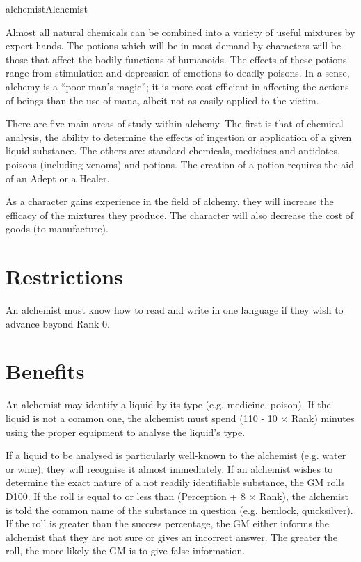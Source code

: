 \begin{Skill}[1.1]{alchemist}{Alchemist}

Almost all natural chemicals can be combined into a variety of useful
mixtures by expert hands.  The potions which will be in most demand by
characters will be those that affect the bodily functions of
humanoids. The effects of these potions range from stimulation and
depression of emotions to deadly poisons.  In a sense, alchemy is a
“poor man’s magic”; it is more cost-efficient in affecting the actions
of beings than the use of mana, albeit not as easily applied to the
victim.

There are five main areas of study within alchemy.  The first is that
of chemical analysis, the ability to determine the effects of
ingestion or application of a given liquid substance.  The others are:
standard chemicals, medicines and antidotes, poisons (including
venoms) and potions.  The creation of a potion requires the aid of an
Adept or a Healer.

As a character gains experience in the field of alchemy, they will
increase the efficacy of the mixtures they produce.  The character
will also decrease the cost of goods (to manufacture).

\section{Restrictions}

An alchemist must know how to read and write in one language if they
wish to advance beyond Rank 0.

\section{Benefits}
\label{alchemist:benefits}

An alchemist may identify a liquid by its type (e.g.  medicine,
poison).  If the liquid is not a common one, the alchemist must spend
(110 - 10 × Rank) minutes using the proper equipment to analyse the
liquid’s type.

If a liquid to be analysed is particularly well-known to the alchemist
(e.g.  water or wine), they will recognise it almost immediately.  If
an alchemist wishes to determine the exact nature of a not readily
identifiable substance, the GM rolls D100.  If the roll is equal to or
less than (Perception + 8 × Rank), the alchemist is told the common
name of the substance in question (e.g. hemlock, quicksilver).  If the
roll is greater than the success percentage, the GM either informs the
alchemist that they are not sure or gives an incorrect answer.  The
greater the roll, the more likely the GM is to give false information.


\end{Skill}
